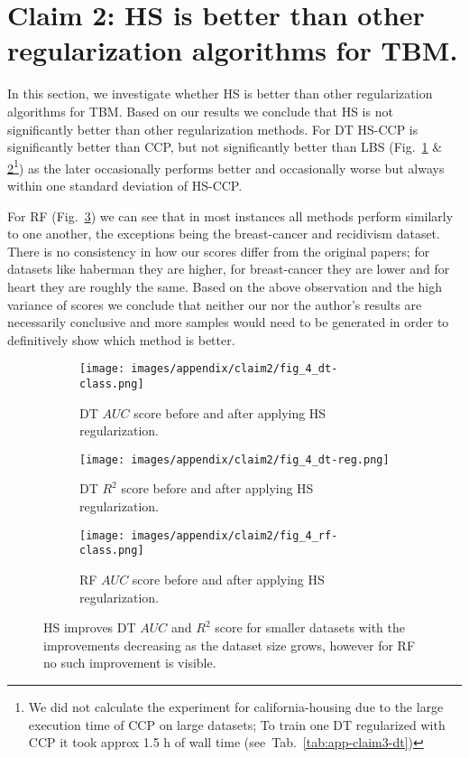 \section{Claim 2: HS is better than other regularization algorithms for TBM.}
\label{appendix:claim2}

In this section, we investigate whether HS is better than other regularization algorithms for TBM. 
Based on our results we conclude that HS is not significantly better than other regularization methods. 
For DT HS-CCP is significantly better than CCP, but not significantly better than LBS (Fig.~\ref{app2-class} \& \ref{app2-reg}\footnote{We did not calculate the experiment for california-housing due to the large execution time of CCP on large datasets; To train one DT regularized with CCP it took approx 1.5 h of wall time (see~Tab.~\ref{tab:app-claim3-dt})}) as the later occasionally performs better and occasionally worse but always within one standard deviation of HS-CCP.

For RF (Fig.~\ref{app2-rf}) we can see that in most instances all methods perform similarly to one another, the exceptions being the breast-cancer and recidivism dataset. 
There is no consistency in how our scores differ from the original papers; for datasets like haberman they are higher, for breast-cancer they are lower and for heart they are roughly the same. 
Based on the above observation and the high variance of scores we conclude that neither our nor the author's results are necessarily conclusive and more samples would need to be generated in order to definitively show which method is better.

\begin{figure}[hbt]
    \centering
    \begin{subfigure}[b]{\textwidth}
        \centering
        \texttt{[image: images/appendix/claim2/fig\_4\_dt-class.png]}
        \caption{DT $AUC$ score before and after applying HS regularization. \label{app2-class}}
    \end{subfigure}
    \vspace{-1em}
    
    \begin{subfigure}[b]{\textwidth}
        \centering
        \texttt{[image: images/appendix/claim2/fig\_4\_dt-reg.png]}
        \caption{DT $R^2$ score before and after applying HS regularization. \label{app2-reg}}
    \end{subfigure}
    \vspace{-1em}
    
    \begin{subfigure}[b]{\textwidth}
        \centering
        \texttt{[image: images/appendix/claim2/fig\_4\_rf-class.png]}
        \caption{RF $AUC$ score before and after applying HS regularization. \label{app2-rf}}
    \end{subfigure}
    \caption{HS improves DT $AUC$ and $R^2$ score for smaller datasets with the improvements decreasing as the dataset size grows, however for RF no such improvement is visible.}
    \label{fig:apendix-fig4-claim2}
\end{figure}

